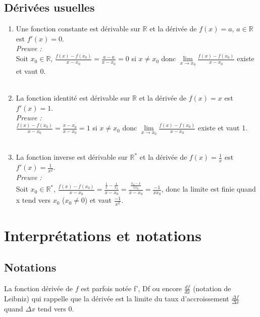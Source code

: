 \documentclass[a4paper,10pt]{book} %
\newcommand{\R}{\mathbb{R}}
\begin{document}
\subsection{Dérivées usuelles}
\begin{enumerate}
\item Une fonction constante est dérivable sur $\R$ et la dérivée de $f(x)=a$, $a\in \R$ est $f'(x)=0$.\\

\emph{Preuve :}\\
Soit $x_{0}\in \R$, $\frac{f(x)-f(x_{0})}{x-x_{0}}=\frac{a-a}{x-x_{0}}=0$ si $x\neq x_{0}$ donc $\lim\limits_{x\rightarrow x_{0}}\frac{f(x)-f(x_{0})}{x-x_{0}}$ existe et vaut 0.\\\\

\item La fonction identité est dérivable sur $\R$ et la dérivée de $f(x)=x$ est $f'(x)=1$.\\

\emph{Preuve :}\\
$\frac{f(x)-f(x_{0})}{x-x_{0}}=\frac{x-x_{0}}{x-x_{0}}=1$ si $x\neq x_{0}$ donc $\lim\limits_{x\rightarrow x_{0}}\frac{f(x)-f(x_{0})}{x-x_{0}}$ existe et vaut 1.\\\\

\item La fonction inverse est dérivable sur $\R^*$ et la dérivée de $f(x)=\frac{1}{x}$ est $f'(x)=\frac{1}{x^2}$.\\

\emph{Preuve :}\\
Soit $x_{0}\in \R^{*}$, $\frac{f(x)-f(x_{0})}{x-x_{0}}=\frac{\frac{1}{x}-\frac{1}{x_{0}}}{x-x_{0}}
=\frac{\frac{x_0-x}{xx_0}}{x-x_0}=\frac{-1}{xx_{0}}$, donc la limite est finie quand x tend vers $x_{0}$ ($x_0\neq 0$) et vaut $\frac{-1}{x^{2}}$.
\end{enumerate}

\newpage

\section{Interprétations et notations}
\subsection{Notations}
La fonction dérivée de $f$ est parfois notée f', Df ou encore $\frac{df}{dx}$ (notation de Leibniz) qui rappelle que la dérivée est la limite du taux d'accroissement $\frac{\Delta f}{\Delta x}$ quand $\Delta x$ tend vers 0.\\
\end{document}
